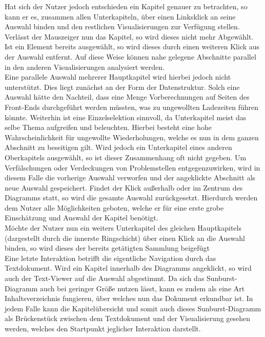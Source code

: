 Hat sich der Nutzer jedoch entschieden ein Kapitel genauer zu betrachten, so kann er es, zusammen allen Unterkapiteln, \"uber einen Linksklick an seine Auswahl binden und den restlichen Visualisierungen zur Verf\"ugung stellen. Verl\"asst der Mauszeiger nun das Kapitel, so wird dieses nicht mehr Abgew\"ahlt. Ist ein Element bereits ausgew\"ahlt, so wird dieses durch einen weiteren Klick aus der Auswahl entfernt. Auf diese Weise k\"onnen nahe gelegene Abschnitte parallel in den anderen Visualisierungen analysiert werden.\\
Eine parallele Auswahl mehrerer Hauptkapitel wird hierbei jedoch nicht unterst\"utzt. Dies liegt zun\"achst an der Form der Datenstruktur. Solch eine Auswahl h\"atte den Nachteil, dass eine Menge Vorberechnungen auf Seiten des Front-Ends durchgef\"uhrt werden m\"ussten, was zu ungewollten Ladezeiten f\"uhren k\"onnte. Weiterhin ist eine Einzelselektion sinnvoll, da Unterkapitel meist das selbe Thema aufgreifen und beleuchten. Hierbei besteht eine hohe Wahrscheinlichkeit f\"ur ungewollte Wiederholungen, welche es nun in dem ganzen Abschnitt zu beseitigen gilt. Wird jedoch ein Unterkapitel eines anderen Oberkapitels ausgew\"ahlt, so ist dieser Zusammenhang oft nicht gegeben. Um Verf\"alschungen oder Verdeckungen von Problemstellen entgegenzuwirken, wird in diesem Falle die vorherige Auswahl verworfen und der angeklickte Abschnitt als neue Auswahl gespeichert. Findet der Klick au{\ss}erhalb oder im Zentrum des Diagramms statt, so wird die gesamte Auswahl zur\"uckgesetzt. Hierdurch werden dem Nutzer alle M\"oglichkeiten geboten, welche er f\"ur eine erste grobe Einsch\"atzung und Auswahl der Kapitel ben\"otigt.\\
M\"ochte der Nutzer nun ein weiters Unterkapitel des gleichen Hauptkapitels (dargestellt durch die innerste Ringschicht) \"uber einen Klick an die Auswahl binden, so wird dieses der bereits get\"atigten Sammlung beigef\"ugt
\\
Eine letzte Interaktion betrifft die eigentliche Navigation durch das Textdokument. Wird ein Kapitel innerhalb des Diagramms angeklickt, so wird auch der Text-Viewer auf die Auswahl abgestimmt. Da sich das Sunburst-Diagramm auch bei geringer Gr\"o{\ss}e nutzen l\"asst, kann es zudem  als eine Art Inhaltsverzeichnis fungieren, \"uber welches nun das Dokument erkundbar ist. In jedem Falle kann die Kapitel\"ubersicht und somit auch dieses Sunburst-Diagramm als Br\"uckenst\"uck zwischen dem Textdokument und der Visualisierung gesehen werden, welches den Startpunkt jeglicher Interaktion darstellt.

